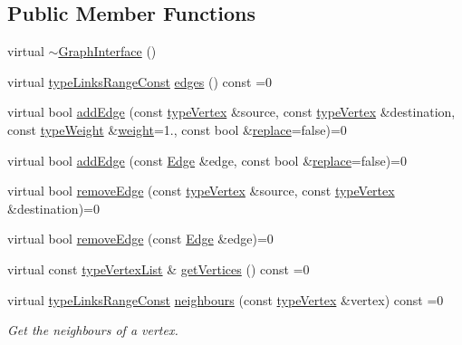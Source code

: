 \subsection*{Public Member Functions}
\begin{DoxyCompactItemize}
\item 
virtual \hyperlink{classGraphInterface_a5f708904a9469c548d85a6788a245340}{$\sim$\+Graph\+Interface} ()
\item 
virtual \hyperlink{graphInterface_8h_ae8d27008f15586bbf419af7ad2e0a48a}{type\+Links\+Range\+Const} \hyperlink{classGraphInterface_a2ac54d73e88516d6793a9a6fc0e434ee}{edges} () const =0
\item 
virtual bool \hyperlink{classGraphInterface_ad72b49c0585d378b7a6488cf07074586}{add\+Edge} (const \hyperlink{edge_8h_a5fbd20c46956d479cb10afc9855223f6}{type\+Vertex} \&source, const \hyperlink{edge_8h_a5fbd20c46956d479cb10afc9855223f6}{type\+Vertex} \&destination, const \hyperlink{edge_8h_a2e7ea3be891ac8b52f749ec73fee6dd2}{type\+Weight} \&\hyperlink{classGraphInterface_a27f350094f566bb4840f22c5bc0695c4}{weight}=1., const bool \&\hyperlink{classGraphInterface_a448a3c66fb5650339f84366257d322ee}{replace}=false)=0
\item 
virtual bool \hyperlink{classGraphInterface_ae77357ec21f272f1e3fb4c93c5f99675}{add\+Edge} (const \hyperlink{classEdge}{Edge} \&edge, const bool \&\hyperlink{classGraphInterface_a448a3c66fb5650339f84366257d322ee}{replace}=false)=0
\item 
virtual bool \hyperlink{classGraphInterface_a1297fd6d7c9698197b5f570f2a9f3701}{remove\+Edge} (const \hyperlink{edge_8h_a5fbd20c46956d479cb10afc9855223f6}{type\+Vertex} \&source, const \hyperlink{edge_8h_a5fbd20c46956d479cb10afc9855223f6}{type\+Vertex} \&destination)=0
\item 
virtual bool \hyperlink{classGraphInterface_a954e2d16f474cce832f02d4495df3092}{remove\+Edge} (const \hyperlink{classEdge}{Edge} \&edge)=0
\item 
virtual const \hyperlink{graphInterface_8h_a21d54d8a139def524d3b0d6f71ec4974}{type\+Vertex\+List} \& \hyperlink{classGraphInterface_a94af429415c22cba42ecf5a97ee6b5c3}{get\+Vertices} () const =0
\item 
virtual \hyperlink{graphInterface_8h_ae8d27008f15586bbf419af7ad2e0a48a}{type\+Links\+Range\+Const} \hyperlink{classGraphInterface_a23e03d032193544c77d04310fe9e4785}{neighbours} (const \hyperlink{edge_8h_a5fbd20c46956d479cb10afc9855223f6}{type\+Vertex} \&vertex) const =0
\begin{DoxyCompactList}\small\item\em Get the neighbours of a vertex. \end{DoxyCompactList}\item 

\end{DoxyCompactItemize}
